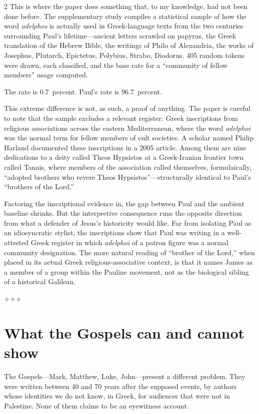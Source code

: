 \documentclass[11pt,oneside]{article}
\newcommand{\sectbreak}{%
  \par\vspace{1.3em}
  \noindent\hfil
  {\color{accent}$\diamond$\hspace{0.5em}$\diamond$\hspace{0.5em}$\diamond$}%
  \hfil\par\vspace{1em}}
\begin{document}
\begin{multicols}{2}
This is where the paper does something that, to my knowledge, had
not been done before.  The supplementary study compiles a
statistical sample of how the word \textit{adelphos} is actually
used in Greek-language texts from the two centuries surrounding
Paul's lifetime---ancient letters scrawled on papyrus, the Greek
translation of the Hebrew Bible, the writings of Philo of
Alexandria, the works of Josephus, Plutarch, Epictetus, Polybius,
Strabo, Diodorus.  405 random tokens were drawn, each classified,
and the base rate for a \enquote{community of fellow members}
usage computed.

The rate is 0.7~percent.  Paul's rate is 96.7~percent.

This extreme difference is not, as such, a proof of anything.  The
paper is careful to note that the sample excludes a relevant
register: Greek inscriptions from religious associations across the
eastern Mediterranean, where the word \textit{adelphoi} was the
normal term for fellow members of cult societies.  A scholar named
Philip Harland documented these inscriptions in a 2005 article.
Among them are nine dedications to a deity called Theos Hypsistos at
a Greek-Iranian frontier town called Tanais, where members of the
association called themselves, formulaically, \enquote{adopted
brothers who revere Theos Hypsistos}---structurally identical to
Paul's \enquote{brothers of the Lord.}

Factoring the inscriptional evidence in, the gap between Paul and
the ambient baseline shrinks.  But the interpretive consequence
runs the opposite direction from what a defender of Jesus's
historicity would like.  Far from isolating Paul as an idiosyncratic
stylist, the inscriptions show that Paul was writing in a
well-attested Greek register in which \textit{adelphoi} of a patron
figure was a normal community designation.  The more natural
reading of \enquote{brother of the Lord,} when placed in its actual
Greek religious-associative context, is that it names James as a
member of a group within the Pauline movement, not as the
biological sibling of a historical Galilean.

\sectbreak
\section*{What the Gospels can and cannot show}

The Gospels---Mark, Matthew, Luke, John---present a different
problem.  They were written between 40 and 70 years after the
supposed events, by authors whose identities we do not know, in
Greek, for audiences that were not in Palestine.  None of them
claims to be an eyewitness account.


\end{multicols}
\end{document}
